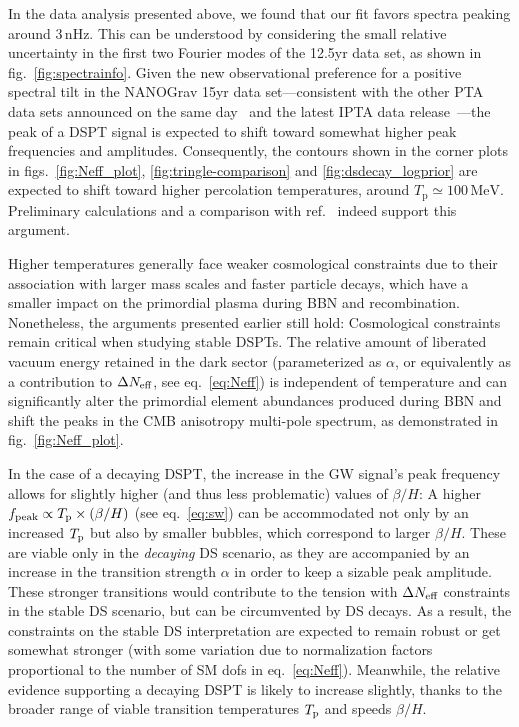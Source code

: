 In the data analysis presented above, we found that our fit favors spectra peaking around $3 \, \text{nHz}$. This can be understood by considering the small relative uncertainty in the first two Fourier modes of the 12.5yr data set, as shown in fig.~\ref{fig:spectrainfo}. Given the new observational preference for a positive spectral tilt in the \ac{NANOGrav} 15yr data set---consistent with the other \ac{PTA} data sets announced on the same  day~\cite{EPTA:2023fyk, Reardon:2023gzh} and the latest \ac{IPTA} data release~\cite{Antoniadis:2022pcn}---the peak of a \ac{DSPT} signal is expected to shift toward somewhat higher peak frequencies and amplitudes. Consequently, the contours shown in the corner plots in figs.~\ref{fig:Neff_plot}, \ref{fig:tringle-comparison} and \ref{fig:dsdecay_logprior} are expected to shift toward higher percolation temperatures, around $T_\text{p} \simeq 100 \, \text{MeV}$. Preliminary calculations and a comparison with ref.~\cite{NANOGrav:2023hvm} indeed support this argument.

Higher temperatures generally face weaker cosmological constraints due to their association with larger mass scales and faster particle decays, which have a smaller impact on the primordial plasma during \ac{BBN} and recombination. Nonetheless, the arguments  presented earlier still hold: Cosmological constraints remain critical when studying stable \acp{DSPT}. The relative amount of liberated vacuum energy retained in the dark sector (parameterized as $\alpha$, or equivalently as a contribution to $\Delta N_\text{eff} $, see eq.~\eqref{eq:Neff}) is independent of temperature and can significantly alter the primordial element abundances produced during \ac{BBN} and shift the peaks in the \ac{CMB} anisotropy multi-pole spectrum, as demonstrated in fig.~\ref{fig:Neff_plot}.

In the case of a decaying \ac{DSPT}, the increase in the \ac{GW} signal’s peak frequency allows for slightly higher (and thus less problematic) values of $\beta/H$: A higher $f_\text{peak} \propto T_{\text{p}} \times (\beta/H)$ (see eq.~\eqref{eq:sw}) can be accommodated not only by an increased $T_{\text{p}}$ but also by smaller bubbles, which correspond to larger $\beta/H$. These are viable only in the \textit{decaying} \ac{DS} scenario, as they are accompanied by an increase in the transition strength $\alpha$ in order to keep a sizable peak amplitude. These stronger transitions would contribute to the tension with $\Delta N_\text{eff} $ constraints in the stable \ac{DS} scenario, but can be circumvented by \ac{DS} decays. As a  result, the constraints on the stable \ac{DS} interpretation are expected to remain robust or get somewhat stronger (with some variation due to normalization factors proportional to the number of \ac{SM} \acp{dof} in eq.~\eqref{eq:Neff}). Meanwhile, the relative evidence supporting a decaying \ac{DSPT} is likely to increase slightly, thanks to the broader range of viable transition temperatures $T_{\text{p}}$ and speeds $\beta/H$.

